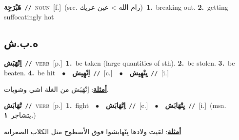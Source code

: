 \documentclass[10pt,a4paper,twoside]{article} %
\begin{document}
\begin{multicols}{2}
{\setlength\topsep{0pt}\textbf{\foreignlanguage{arabic}{هَبْرَجِة}}\ {\color{gray}\texttt{//}\color{black}}\ \textsc{noun}\ [f.]\ (src. \color{gray}\foreignlanguage{arabic}{رام الله > عين عريك}\color{black})\ \textbf{1.}~breaking out.  \textbf{2.}~getting suffocatingly hot\ } \vspace{2mm}

\vspace{-3mm}
\subsection*{\color{blue}\foreignlanguage{arabic}{ه.ب.ش}\color{blue}{}} 

{\setlength\topsep{0pt}\textbf{\foreignlanguage{arabic}{اِنْهَبَش}}\ {\color{gray}\texttt{//}\color{black}}\ \textsc{verb}\ [p.]\ \textbf{1.}~be taken (large quantities of sth).  \textbf{2.}~be stolen.  \textbf{3.}~be beaten.  \textbf{4.}~be hit\ \ $\bullet$\ \ \setlength\topsep{0pt}\textbf{\foreignlanguage{arabic}{اِنْهِبِش}}\ {\color{gray}\texttt{//}\color{black}}\ [c.]\ \ $\bullet$\ \ \setlength\topsep{0pt}\textbf{\foreignlanguage{arabic}{يِنْهِبِش}}\ {\color{gray}\texttt{//}\color{black}}\ [i.]\  \begin{flushright}\color{gray}\foreignlanguage{arabic}{\textbf{\underline{\foreignlanguage{arabic}{أمثلة}}}: اِنْهَبَش من الغلة اشي وشويات.}\end{flushright}\color{black}} \vspace{2mm}

{\setlength\topsep{0pt}\textbf{\foreignlanguage{arabic}{تْهَابَش}}\ {\color{gray}\texttt{//}\color{black}}\ \textsc{verb}\ [p.]\ \textbf{1.}~fight\ \ $\bullet$\ \ \setlength\topsep{0pt}\textbf{\foreignlanguage{arabic}{اِتْهَابَش}}\ {\color{gray}\texttt{//}\color{black}}\ [c.]\ \ $\bullet$\ \ \setlength\topsep{0pt}\textbf{\foreignlanguage{arabic}{يِتْهَابَش}}\ {\color{gray}\texttt{//}\color{black}}\ [i.]\ \color{gray}(msa. \foreignlanguage{arabic}{يتشاجر}~\foreignlanguage{arabic}{\textbf{١.}})\color{black}\  \begin{flushright}\color{gray}\foreignlanguage{arabic}{\textbf{\underline{\foreignlanguage{arabic}{أمثلة}}}: لقيت ولادها بِتْهابشوا فوق الأسطوح مثل الكلاب الصعرانة}\end{flushright}\color{black}} \vspace{2mm}


\end{multicols}
\end{document}
